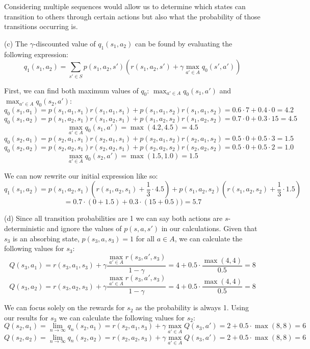 \documentclass[12pt]{article}
\begin{document}
Considering multiple sequences would allow us to determine which states can transition to others through certain actions but also what the probability of those transitions occurring is.

\noindent (c) The $\gamma$-discounted value of $q_1(s_1, a_2)$ can be found by evaluating the following expression:
$$q_1(s_1, a_2) = \sum_{s' \in S}p(s_1, a_2, s')(r(s_1, a_2, s') + \gamma \max_{a' \in A} q_0(s', a'))$$

First, we can find both maximum values of $q_0$: $\max_{a' \in A} q_0(s_1, a')$ and $\max_{a' \in A} q_0(s_2, a')$:
$$q_0(s_1, a_1) = p(s_1, a_1, s_1)r(s_1, a_1, s_1) + p(s_1, a_1, s_2)r(s_1, a_1, s_2) = 0.6 \cdot 7 + 0.4 \cdot 0 = 4.2$$
$$q_0(s_1, a_2) = p(s_1, a_2, s_1)r(s_1, a_2, s_1) + p(s_1, a_2, s_2)r(s_1, a_2, s_2) = 0.7 \cdot 0 + 0.3 \cdot 15 = 4.5$$
$$\max_{a' \in A} q_0(s_1, a') = \max (4.2, 4.5) = 4.5$$
$$q_0(s_2, a_1) = p(s_2, a_1, s_1)r(s_2, a_1, s_1) + p(s_2, a_1, s_2)r(s_2, a_1, s_2) = 0.5 \cdot 0 + 0.5 \cdot 3 = 1.5$$
$$q_0(s_2, a_2) = p(s_2, a_2, s_1)r(s_2, a_2, s_1) + p(s_2, a_2, s_2)r(s_2, a_2, s_2) = 0.5 \cdot 0 + 0.5 \cdot 2 = 1.0$$
$$\max_{a' \in A} q_0(s_2, a') = \max (1.5, 1.0) = 1.5$$

We can now rewrite our initial expression like so:
$$q_1(s_1, a_2) = p(s_1, a_2, s_1)(r(s_1, a_2, s_1) + \frac{1}{3} \cdot 4.5) + p(s_1, a_2, s_2)(r(s_1, a_2, s_2) + \frac{1}{3} \cdot 1.5)$$
$$= 0.7 \cdot (0 + 1.5) + 0.3 \cdot (15 + 0.5)) = 5.7$$

\noindent (d) Since all transition probabilities are 1 we can say both actions are $s$-deterministic and ignore the values of $p(s, a, s')$ in our calculations. Given that $s_3$ is an absorbing state, $p(s_3, a, s_3) = 1$ for all $a \in A$, we can calculate the following values for $s_3$:
$$Q(s_3, a_1) = r(s_3, a_1, s_3) + \gamma \frac{\max_{a' \in A} r(s_3, a', s_3)}{1 - \gamma} = 4 + 0.5 \cdot \frac{\max(4, 4)}{0.5} = 8$$
$$Q(s_3, a_2) = r(s_3, a_2, s_3) + \gamma \frac{\max_{a' \in A} r(s_3, a', s_3)}{1 - \gamma} = 4 + 0.5 \cdot \frac{\max(4, 4)}{0.5} = 8$$

We can focus solely on the rewards for $s_2$ as the probability is always 1. Using our results for $s_3$ we can calculate the following values for $s_2$:
$$Q(s_2, a_1) = \lim_{n \rightarrow \infty} q_n(s_2, a_1) = r(s_2, a_1, s_3) + \gamma \max_{a' \in A}Q(s_3, a') = 2 + 0.5 \cdot \max(8, 8) = 6$$
$$Q(s_2, a_2) = \lim_{n \rightarrow \infty} q_n(s_2, a_2) = r(s_2, a_2, s_3) + \gamma \max_{a' \in A}Q(s_3, a') = 2 + 0.5 \cdot \max(8, 8) = 6$$
\end{document}

